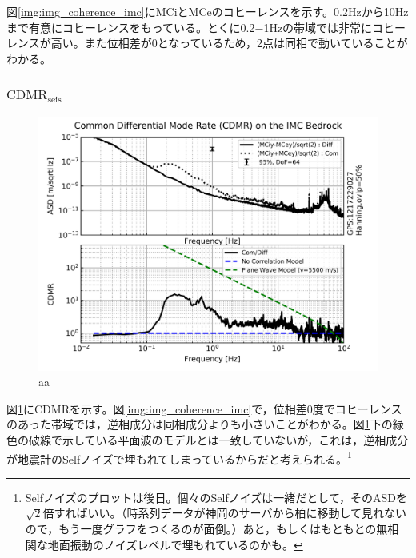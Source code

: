 図\ref{img:img_coherence_imc}にMCiとMCeのコヒーレンスを示す。0.2Hzから10Hzまで有意にコヒーレンスをもっている。とくに0.2−1Hzの帯域では非常にコヒーレンスが高い。また位相差が0となっているため，2点は同相で動いていることがわかる。



\subsubsection{$\mathrm{CDMR_{seis}}$}
\begin{figure}[H]
  \begin{center}
    \includegraphics[width=11.5cm]{./cdmr_imc.png}
  \end{center}
  \caption{aa}\label{img:img_cdmr_imc}
\end{figure}
図\ref{img:img_cdmr_imc}にCDMRを示す。図\ref{img:img_coherence_imc}で，位相差0度でコヒーレンスのあった帯域では，逆相成分は同相成分よりも小さいことがわかる。図\ref{img:img_cdmr_imc}下の緑色の破線で示している平面波のモデルとは一致していないが，これは，逆相成分が地震計のSelfノイズで埋もれてしまっているからだと考えられる。\footnote[12]{Selfノイズのプロットは後日。個々のSelfノイズは一緒だとして，そのASDを$\sqrt{2}$倍すればいい。（時系列データが神岡のサーバから柏に移動して見れないので，もう一度グラフをつくるのが面倒。）あと，もしくはもともとの無相関な地面振動のノイズレベルで埋もれているのかも。}





